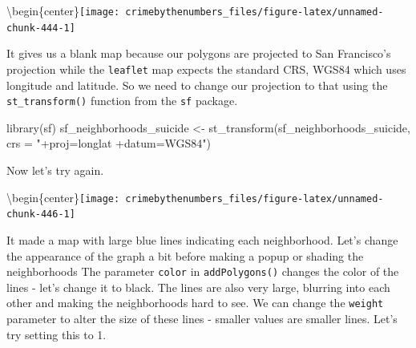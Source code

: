 \documentclass[
]{krantz}
\makeatletter
\newenvironment{Shaded}{\begin{snugshade}}{\end{snugshade}}
\newcommand{\AttributeTok}[1]{\textcolor[rgb]{0.61,0.61,0.61}{#1}}
\newcommand{\FunctionTok}[1]{\textcolor[rgb]{0,0,0}{#1}}
\newcommand{\NormalTok}[1]{#1}
\newcommand{\OtherTok}[1]{\textcolor[rgb]{0.37,0.37,0.37}{#1}}
\newcommand{\SpecialCharTok}[1]{\textcolor[rgb]{0,0,0}{#1}}
\newcommand{\StringTok}[1]{\textcolor[rgb]{0.5,0.5,0.5}{#1}}
\newenvironment{kframe}{%
\medskip{}
\setlength{\fboxsep}{.8em}
 \def\at@end@of@kframe{}%
 \ifinner\ifhmode%
  \def\at@end@of@kframe{\end{minipage}}%
  \begin{minipage}{\columnwidth}%
 \fi\fi%
 \def\FrameCommand##1{\hskip\@totalleftmargin \hskip-\fboxsep
 \colorbox{shadecolor}{##1}\hskip-\fboxsep
     \hskip-\linewidth \hskip-\@totalleftmargin \hskip\columnwidth}%
 \MakeFramed {\advance\hsize-\width
   \@totalleftmargin\z@ \linewidth\hsize
   \@setminipage}}%
 {\par\unskip\endMakeFramed%
 \at@end@of@kframe}
\renewenvironment{Shaded}{\begin{kframe}}{\end{kframe}}
\makeatother
\begin{document}
\textbackslash begin\{center\}\texttt{[image: crimebythenumbers\_files/figure-latex/unnamed-chunk-444-1]}

It gives us a blank map because our polygons are projected to San Francisco's projection while the \texttt{leaflet} map expects the standard CRS, WGS84 which uses longitude and latitude. So we need to change our projection to that using the \texttt{st\_transform()} function from the \texttt{sf} package.

\begin{Shaded}
\begin{Highlighting}[]
\FunctionTok{library}\NormalTok{(sf)}
\NormalTok{sf\_neighborhoods\_suicide }\OtherTok{\textless{}{-}} \FunctionTok{st\_transform}\NormalTok{(sf\_neighborhoods\_suicide,}
                                         \AttributeTok{crs =} \StringTok{"+proj=longlat +datum=WGS84"}\NormalTok{)}
\end{Highlighting}
\end{Shaded}

Now let's try again.

\begin{Shaded}
\end{Shaded}

\textbackslash begin\{center\}\texttt{[image: crimebythenumbers\_files/figure-latex/unnamed-chunk-446-1]}

It made a map with large blue lines indicating each neighborhood. Let's change the appearance of the graph a bit before making a popup or shading the neighborhoods The parameter \texttt{color} in \texttt{addPolygons()} changes the color of the lines - let's change it to black. The lines are also very large, blurring into each other and making the neighborhoods hard to see. We can change the \texttt{weight} parameter to alter the size of these lines - smaller values are smaller lines. Let's try setting this to 1.
\end{document}
